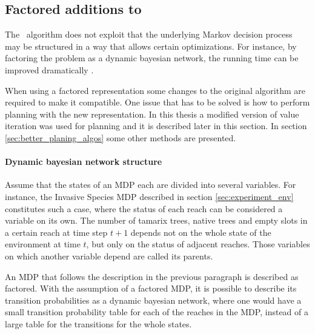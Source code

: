 \subsection{Factored additions to \etre}
\label{sec:factored_e3}

The \etre\ algorithm does not exploit that the underlying Markov decision
process may be structured in a way that allows certain optimizations. For instance, 
by factoring the problem as a dynamic bayesian
network, the running time can be improved dramatically 
\parencite{kearns1999efficient}. 

When using a factored representation some changes to the original algorithm are
required to make it compatible. One issue that has to be solved is how to
perform  planning with the new representation. In this thesis a modified version
of value iteration was used for planning and it is described later in this
section. In section \ref{sec:better_planing_algos} some other methods
are presented.


\paragraph{Dynamic bayesian network structure}

Assume that the states of an MDP each are divided into several variables. For
instance, the Invasive Species MDP described in section
\ref{sec:experiment_env} constitutes such a case, where the status of each
reach can be considered a variable on its own. The number of tamarix trees,
native trees and empty slots in a certain reach at time step $t+1$ depends not
on the whole state of the environment at time $t$, but only on the status of
adjacent reaches. Those variables on which another variable depend are called
its parents.  

An MDP that follows the description in the previous paragraph is described as
factored. With the assumption of a factored MDP, it is possible to describe its
transition probabilities as a dynamic bayesian network, where one would have a
small transition probability table for each of the reaches in the MDP, instead
of a large table for the transitions for the whole states.
